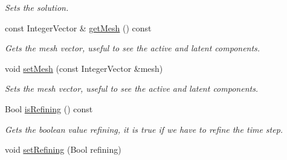 \begin{DoxyCompactItemize}
\begin{DoxyCompactList}\small\item\em Sets the solution. \item\end{DoxyCompactList}\item 
\hypertarget{classMultiRateTRBDF2SolverData_ab3a002810c0bdf01fe2daebe7f309d58}{
const IntegerVector \& \hyperlink{classMultiRateTRBDF2SolverData_ab3a002810c0bdf01fe2daebe7f309d58}{getMesh} () const }
\label{classMultiRateTRBDF2SolverData_ab3a002810c0bdf01fe2daebe7f309d58}

\begin{DoxyCompactList}\small\item\em Gets the mesh vector, useful to see the active and latent components. \item\end{DoxyCompactList}\item 
\hypertarget{classMultiRateTRBDF2SolverData_a08dd24d9391710fa80d3f2d00f157dfe}{
void \hyperlink{classMultiRateTRBDF2SolverData_a08dd24d9391710fa80d3f2d00f157dfe}{setMesh} (const IntegerVector \&mesh)}
\label{classMultiRateTRBDF2SolverData_a08dd24d9391710fa80d3f2d00f157dfe}

\begin{DoxyCompactList}\small\item\em Sets the mesh vector, useful to see the active and latent components. \item\end{DoxyCompactList}\item 
\hypertarget{classMultiRateTRBDF2SolverData_a57d58fc11fd5421bb40446db15fba4e3}{
Bool \hyperlink{classMultiRateTRBDF2SolverData_a57d58fc11fd5421bb40446db15fba4e3}{isRefining} () const }
\label{classMultiRateTRBDF2SolverData_a57d58fc11fd5421bb40446db15fba4e3}

\begin{DoxyCompactList}\small\item\em Gets the boolean value refining, it is true if we have to refine the time step. \item\end{DoxyCompactList}\item 
\hypertarget{classMultiRateTRBDF2SolverData_ac8152b7b7603e631afbd58b689615eaa}{
void \hyperlink{classMultiRateTRBDF2SolverData_ac8152b7b7603e631afbd58b689615eaa}{setRefining} (Bool refining)}
\label{classMultiRateTRBDF2SolverData_ac8152b7b7603e631afbd58b689615eaa}


\end{DoxyCompactItemize}
